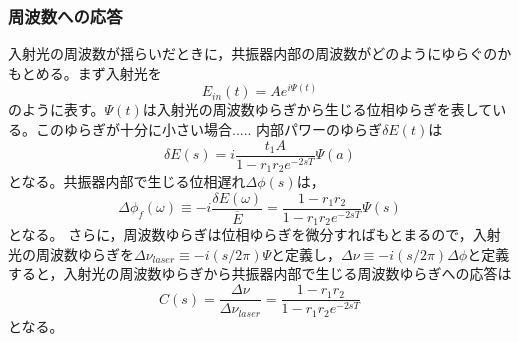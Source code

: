 \subsubsection{周波数への応答}
入射光の周波数が揺らいだときに，共振器内部の周波数がどのようにゆらぐのかもとめる。まず入射光を
\begin{equation}
E_{in}(t) = Ae^{i\Psi(t)}
\end{equation}
のように表す。$\Psi(t)$は入射光の周波数ゆらぎから生じる位相ゆらぎを表している。このゆらぎが十分に小さい場合.....
内部パワーのゆらぎ$\delta{E(t)}$は
\begin{equation}
\delta{E(s)} = i \frac{t_{1}A}{1-r_{1}r_{2}e^{-2sT}}\Psi(a)
\end{equation}
となる。共振器内部で生じる位相遅れ$\Delta{\phi(s)}$は，
\begin{equation}
\Delta{\phi_{f}(\omega)} \equiv -i \frac{\delta{E}(\omega)}{\overline{E}} = \frac{1-r_{1}r_{2}}{1-r_{1}r_{2}e^{-2sT}}\Psi{(s)} 
\end{equation}
となる。
さらに，周波数ゆらぎは位相ゆらぎを微分すればもとまるので，入射光の周波数ゆらぎを$\Delta{\nu_{laser}}\equiv -i(s/2\pi)\Psi$と定義し，$\Delta{\nu}\equiv -i(s/2\pi)\Delta\phi$と定義すると，入射光の周波数ゆらぎから共振器内部で生じる周波数ゆらぎへの応答は
\begin{equation}
 \boxed{C(s) = \frac{\Delta\nu}{\Delta\nu_{laser}} = \frac{1-r_{1}r_{2}}{1-r_{1}r_{2}e^{-2sT}}}
\end{equation}
となる。
